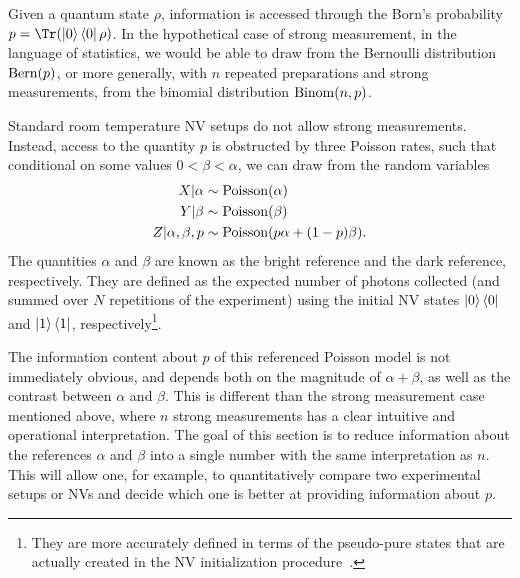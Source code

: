 \documentclass[aps,nofootinbib,twocolumn,superscriptaddress]{revtex4}
\begin{document}
Given a quantum state $\rho$,
information is accessed through the
Born's probability $p=\Tr(\ketbra{0}\rho)$.
In the hypothetical case of strong measurement, in the language
of statistics, we would be able to draw from
the Bernoulli distribution $\operatorname{Bern}(p)$, or more generally, with
$n$ repeated preparations and strong measurements, from
the binomial distribution $\operatorname{Binom}(n,p)$.

Standard room temperature NV setups do not allow strong measurements.
Instead, access to the quantity $p$ is obstructed by three Poisson rates,
such that conditional on some values $0<\beta<\alpha$, we can
draw from the random variables
\begin{align}
    X|\alpha &\sim \operatorname{Poisson}(\alpha) \nonumber \\
    Y|\beta &\sim \operatorname{Poisson}(\beta) \nonumber \\
    Z|\alpha,\beta,p &\sim \operatorname{Poisson}(p\alpha + (1-p)\beta).
\end{align}
The quantities $\alpha$ and $\beta$ are known as the bright reference
and the dark reference, respectively.
They are defined as the
expected number of photons collected (and summed over $N$
repetitions of the experiment) using the initial NV states
$\ket{0}\bra{0}$ and $\ket{1}\bra{1}$, respectively\footnote{They are
more accurately defined in terms of the pseudo-pure states
that are actually created in the NV initialization procedure~\cite{hincks_statistical_2018}.}.

The information content about $p$ of this referenced Poisson model is not
immediately obvious,
and depends both on the magnitude of $\alpha+\beta$,
as well as the contrast between $\alpha$ and $\beta$.
This is different than the strong measurement case mentioned above,
where $n$ strong measurements has a clear intuitive and operational
interpretation.
The goal of this section is to reduce information about the references
$\alpha$ and $\beta$ into a single number
with the same interpretation as $n$.
This will allow one, for example,
to quantitatively compare two experimental setups or NVs and
decide which one is better at providing information about $p$.
\end{document}
